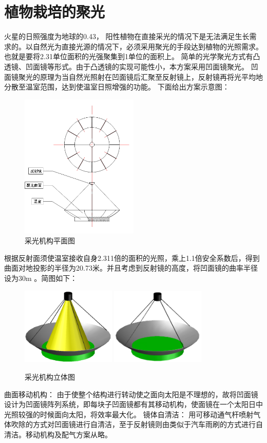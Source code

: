 \clearpage
\section{植物栽培的聚光}
\label{sec:energy-plant}

火星的日照强度为地球的0.43，
阳性植物在直接采光的情况下是无法满足生长需求的。以自然光为直接光源的情况下，必须采用聚光的手段达到植物的光照需求。也就是要将2.31单位面积的光强聚集到1单位的面积上。
简单的光学聚光方式有凸透镜、凹面镜等形式。由于凸透镜的实现可能性小，本方案采用凹面镜聚光。
凹面镜聚光的原理为当自然光照射在凹面镜后汇聚至反射镜上，反射镜再将光平均地分散至温室范围，达到使温室日照增强的功能。
下面给出方案示意图：
\begin{figure}[H]
  \centering
  \includegraphics[width=0.5\textwidth]{figure/fanguang-pingmain.png}
  \caption{采光机构平面图}
\end{figure}

根据反射面须使温室接收自身2.311倍的面积的光照，乘上1.1倍安全系数后，得到曲面对地投影的半径为20.73米。并且考虑到反射镜的高度，将凹面镜的曲率半径设为30\si{\meter} 。简图如下：
\begin{figure}[H]
  \centering
  \includegraphics[width=0.4\textwidth]{figure/fanguang-kaideng.png}
  \includegraphics[width=0.4\textwidth]{figure/fanguange-liti.png}
  \caption{采光机构立体图}
\end{figure}

曲面移动机构：  由于使整个结构进行转动使之面向太阳是不理想的，故将凹面镜设计为凹面镜阵列系统，即每块子凹面镜都有其移动机构，使面镜在一个太阳日中光照较强的时候面向太阳，将效率最大化。
镜体自清洁： 用可移动通气杆喷射气体吹除的方式对凹面镜进行自清洁，至于反射镜则由类似于汽车雨刷的方式进行自清洁。移动机构及配气方案从略。
